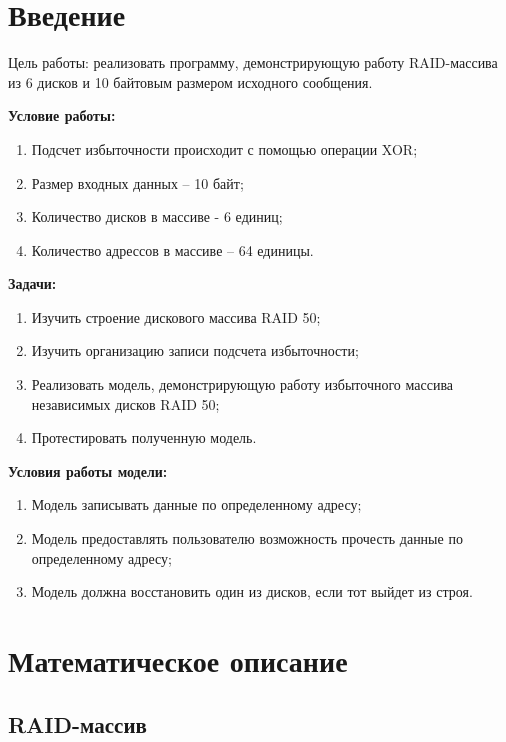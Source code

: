 \documentclass[10pt,a4paper,final]{article} %
\begin{document}
\tableofcontents

\newpage
\section* {Введение}

Цель работы: реализовать программу, демонстрирующую работу RAID-массива из 6 дисков и 10 байтовым размером исходного сообщения.

\textbf{Условие работы:}

\begin{enumerate}
	\item Подсчет избыточности  происходит с помощью  операции XOR;
	\item Размер входных данных -- 10 байт;
	\item Количество дисков в массиве - 6 единиц;
	\item Количество адрессов в массиве -- 64 единицы.
\end{enumerate}

\textbf{Задачи:}
\begin{enumerate}
	\item Изучить строение дискового массива RAID 50;
	\item Изучить организацию записи подсчета избыточности;
	\item Реализовать модель, демонстрирующую работу избыточного массива независимых дисков RAID 50;
	\item Протестировать полученную модель.
\end{enumerate}

\textbf{Условия работы модели:}
\begin{enumerate}
	\item Модель записывать данные по определенному адресу;
	\item Модель предоставлять пользователю возможность прочесть данные по определенному адресу;
	\item Модель должна восстановить один из дисков, если тот выйдет из строя.
\end{enumerate}


\newpage
\section{Математическое описание}
\subsection{RAID-массив}
\end{document}
